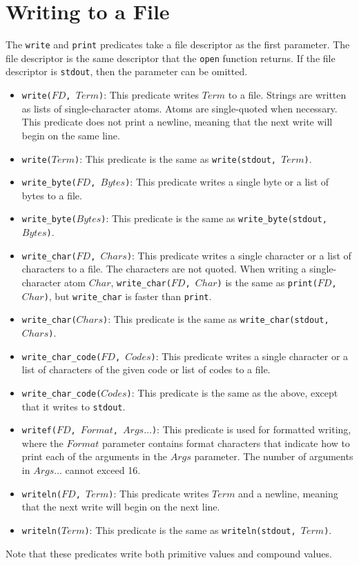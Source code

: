 \section{Writing to a File}
The \texttt{write} and \texttt{print} predicates take a file descriptor as the first parameter.  The file descriptor is the same descriptor that the \texttt{open} function returns. If the file descriptor is \texttt{stdout}, then the parameter can be omitted.
\begin{itemize}
\item \texttt{write($FD$, $Term$)}: This predicate writes $Term$ to a file.  Strings are written as lists of single-character atoms.  Atoms are single-quoted when necessary.  This predicate does not print a newline, meaning that the next write will begin on the same line.
\item \texttt{write($Term$)}: This predicate is the same as \texttt{write(stdout, $Term$)}.
\item \texttt{write\_byte($FD$, $Bytes$)}: This predicate writes a single byte or a list of bytes to a file.
\item \texttt{write\_byte($Bytes$)}: This predicate is the same as \texttt{write\_byte(stdout, $Bytes$)}.
\item \texttt{write\_char($FD$, $Chars$)}: This predicate writes a single character or a list of characters to a file. The characters are not quoted. When writing a single-character atom $Char$, \texttt{write\_char($FD$, $Char$)} is the same as \texttt{print($FD$, $Char$)}, but \texttt{write\_char} is faster than \texttt{print}.
\item \texttt{write\_char($Chars$)}: This predicate is the same as \texttt{write\_char(stdout,} \texttt{$Chars$)}.
\item \texttt{write\_char\_code($FD$, $Codes$)}: This predicate writes a single character or a list of characters of the given code or list of codes to a file.
\item \texttt{write\_char\_code($Codes$)}: This predicate is the same as the above, except that it writes to \texttt{stdout}.
\item \texttt{writef($FD$, $Format$, $Args\ldots$)}: This predicate is used for formatted writing, where the $Format$ parameter contains format characters that indicate how to print each of the arguments in the $Args$ parameter. The number of arguments in $Args\ldots$ cannot exceed 16.
\item \texttt{writeln($FD$, $Term$)}: This predicate writes $Term$ and a newline, meaning that the next write will begin on the next line.
\item \texttt{writeln($Term$)}: This predicate is the same as \texttt{writeln(stdout, $Term$)}.
\end{itemize}
Note that these predicates write both primitive values and compound values.

